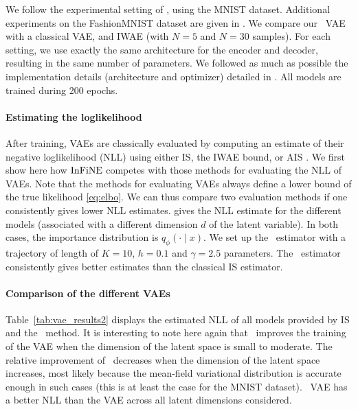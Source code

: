 \documentclass{article}
\begin{document}
We follow the experimental setting of \cite{burda:grosse:2015}, using the MNIST dataset. Additional experiments on the FashionMNIST dataset are given in . We compare our \IFIS\ VAE with a classical VAE, and IWAE (with $N=5$ and $N=30$ samples).
For each setting, we use exactly the same architecture for the encoder and decoder, resulting in the same number of parameters. We followed as much as possible the implementation details (architecture and optimizer) detailed in \cite{burda:grosse:2015}. All models are trained during 200 epochs.


\paragraph{Estimating the loglikelihood}
After training, VAEs are classically evaluated by computing an estimate of their negative loglikelihood (NLL) using either IS, the IWAE bound, or AIS   \cite{wu:burda:grosse:2016}.
We first show here how $\operatorname{InFiNE}$ competes with those methods for evaluating the NLL of VAEs.
Note that the methods for evaluating VAEs always define a lower bound of the true likelihood \eqref{eq:elbo}. We can thus compare two evaluation methods if one consistently gives lower NLL estimates.
 gives the NLL estimate for the different models (associated with a different dimension $d$ of the latent variable). %
In both cases, the importance distribution is  $q_\phi(\cdot\mid x)$.  We set up the \InFiNE\ estimator with a trajectory of length of $K=10$, $h= 0.1$ and $\gamma=2.5$ parameters.
The \InFiNE\ estimator consistently gives better estimates than the classical IS estimator.



\paragraph{Comparison of the different VAEs}
 Table~\ref{tab:vae_results2} displays the estimated NLL of all models provided by IS and the \InFiNE\ method. It is interesting to note here again that \InFiNE\ improves the training of the VAE when the dimension of the latent space is small to moderate. The relative improvement of \InFiNE\ decreases when the dimension of the latent space increases, most likely because the mean-field variational distribution is accurate enough in such cases  (this is at least the case for the MNIST dataset).
\InFiNE\ VAE has a better NLL than the VAE across all latent dimensions considered. %
\end{document}
